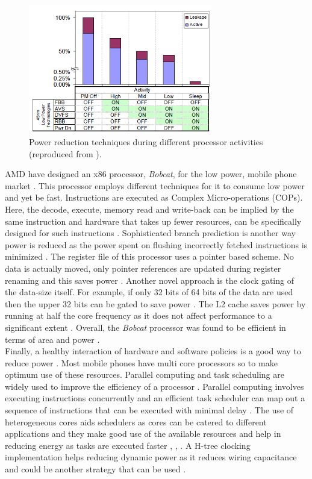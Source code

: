 \documentclass[journal]{IEEEtran}
\begin{document}
	\begin{figure}[h]
	   \centering
	   \includegraphics[width = 8cm]{ABBTech}
	   \caption{Power reduction techniques during different processor activities (reproduced from \cite{ABB}).}
	   \label{Figure:ABBTech}
	\end{figure}	
	\FloatBarrier
	
AMD have designed an x86 processor, \textit{Bobcat}, for the low power, mobile phone market \cite{AMD}. This processor employs different techniques for it to consume low power and yet be fast. Instructions are executed as Complex Micro-operations (COPs). Here, the decode, execute, memory read and write-back can be implied by the same instruction and hardware that takes up fewer resources, can be specifically designed for such instructions \cite{AMD}. Sophisticated branch prediction is another way power is reduced as the power spent on flushing incorrectly fetched instructions is minimized \cite{AMD}. The register file of this processor uses a pointer based scheme. No data is actually moved, only pointer references are updated during register renaming and this saves power \cite{AMD}. Another novel approach is the clock gating of the data-size itself. For example, if only 32 bits of 64 bits of the data are used then the upper 32 bits can be gated to save power \cite{AMD}. The L2 cache saves power by running at half the core frequency as it does not affect performance to a significant extent \cite{AMD}. Overall, the \textit{Bobcat} processor was found to be efficient in terms of area and power \cite{AMD}. \\

Finally, a healthy interaction of hardware and software policies is a good way to reduce power \cite{HD/SF}. Most mobile phones have multi core processors so to make optimum use of these resources. Parallel computing and task scheduling are widely used to improve the efficiency of a processor \cite{HD/SF}. Parallel computing involves executing instructions concurrently and an efficient task scheduler can map out a sequence of instructions that can be executed with minimal delay \cite{HD/SF}. The use of heterogeneous cores aids schedulers as cores can be catered to different applications and they make good use of the available resources and help in reducing energy as tasks are executed faster \cite{HD/SF}, \cite{Heterogeneous}, \cite{HeterogenousFuture}. A H-tree clocking implementation helps reducing dynamic power as it reduces wiring capacitance and could be another strategy that can be used \cite{Heterogeneous}.
\end{document}
